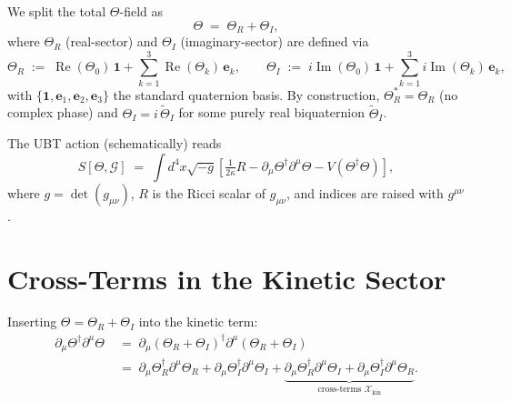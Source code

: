 \documentclass[12pt]{article}
\begin{document}
We split the total $\Theta$-field as
\begin{equation}
  \Theta \;=\; \Theta_R + \Theta_I,
  \label{eq:field_split}
\end{equation}
where $\Theta_R$ (real-sector) and $\Theta_I$ (imaginary-sector)
are defined via
\begin{equation}
  \Theta_R \;:=\; \operatorname{Re}(\Theta_0)\,\mathbf{1}
            + \sum_{k=1}^{3}\operatorname{Re}(\Theta_k)\,\mathbf{e}_k,
  \qquad
  \Theta_I \;:=\; i\operatorname{Im}(\Theta_0)\,\mathbf{1}
            + \sum_{k=1}^{3}i\operatorname{Im}(\Theta_k)\,\mathbf{e}_k,
\end{equation}
with $\{\mathbf{1}, \mathbf{e}_1, \mathbf{e}_2, \mathbf{e}_3\}$ the
standard quaternion basis.  By construction,
$\Theta_R^* = \Theta_R$ (no complex phase) and
$\Theta_I = i\,\widetilde\Theta_I$ for some purely real biquaternion
$\widetilde\Theta_I$.

The UBT action (schematically) reads
\begin{equation}
  S[\Theta, \mathcal{G}]
  \;=\; \int d^4x\sqrt{-g}\left[
    \tfrac{1}{2\kappa}R
    - \partial_\mu\Theta^\dagger \partial^\mu\Theta
    - V(\Theta^\dagger\Theta)
  \right],
  \label{eq:action_gen}
\end{equation}
where $g = \det(g_{\mu\nu})$, $R$ is the Ricci scalar of $g_{\mu\nu}$,
and indices are raised with $g^{\mu\nu}$.

\section{Cross-Terms in the Kinetic Sector}

Inserting $\Theta = \Theta_R + \Theta_I$ into the kinetic term:
\begin{align}
  \partial_\mu\Theta^\dagger \partial^\mu\Theta
  &\;=\; \partial_\mu(\Theta_R + \Theta_I)^\dagger
         \partial^\mu(\Theta_R + \Theta_I) \nonumber\\
  &\;=\; \partial_\mu\Theta_R^\dagger \partial^\mu\Theta_R
       + \partial_\mu\Theta_I^\dagger \partial^\mu\Theta_I
       + \underbrace{\partial_\mu\Theta_R^\dagger \partial^\mu\Theta_I
       + \partial_\mu\Theta_I^\dagger \partial^\mu\Theta_R}_{
         \text{cross-terms } \mathcal{X}_\mathrm{kin}}.
  \label{eq:kinetic_expand}
\end{align}
\end{document}
